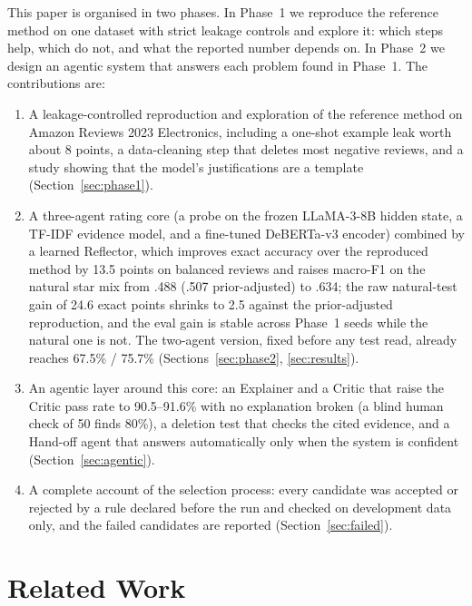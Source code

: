 \documentclass[runningheads]{llncs}
\begin{document}
This paper is organised in two phases. In Phase~1 we reproduce the reference method on one dataset with strict leakage controls and explore it: which steps help, which do not, and what the reported number depends on. In Phase~2 we design an agentic system that answers each problem found in Phase~1. The contributions are:
\begin{enumerate}
\item A leakage-controlled reproduction and exploration of the reference method on Amazon Reviews 2023 Electronics, including a one-shot example leak worth about 8 points, a data-cleaning step that deletes most negative reviews, and a study showing that the model's justifications are a template (Section~\ref{sec:phase1}).
\item A three-agent rating core (a probe on the frozen LLaMA-3-8B hidden state, a TF-IDF evidence model, and a fine-tuned DeBERTa-v3 encoder) combined by a learned Reflector, which improves exact accuracy over the reproduced method by 13.5 points on balanced reviews and raises macro-F1 on the natural star mix from .488 (.507 prior-adjusted) to .634; the raw natural-test gain of 24.6 exact points shrinks to 2.5 against the prior-adjusted reproduction, and the eval gain is stable across Phase~1 seeds while the natural one is not. The two-agent version, fixed before any test read, already reaches 67.5\% / 75.7\% (Sections~\ref{sec:phase2}, \ref{sec:results}).
\item An agentic layer around this core: an Explainer and a Critic that raise the Critic pass rate to 90.5--91.6\% with no explanation broken (a blind human check of 50 finds 80\%), a deletion test that checks the cited evidence, and a Hand-off agent that answers automatically only when the system is confident (Section~\ref{sec:agentic}).
\item A complete account of the selection process: every candidate was accepted or rejected by a rule declared before the run and checked on development data only, and the failed candidates are reported (Section~\ref{sec:failed}).
\end{enumerate}

\section{Related Work}
\end{document}
